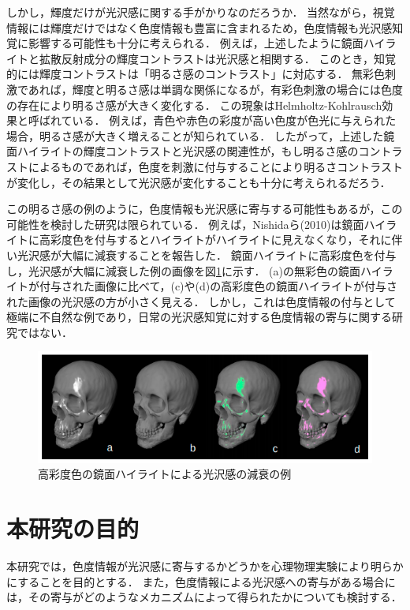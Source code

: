         しかし，輝度だけが光沢感に関する手がかりなのだろうか．
        当然ながら，視覚情報には輝度だけではなく色度情報も豊富に含まれるため，色度情報も光沢感知覚に影響する可能性も十分に考えられる．
        例えば，上述したように鏡面ハイライトと拡散反射成分の輝度コントラストは光沢感と相関する．
        このとき，知覚的には輝度コントラストは「明るさ感のコントラスト」に対応する．
        無彩色刺激であれば，輝度と明るさ感は単調な関係になるが，有彩色刺激の場合には色度の存在により明るさ感が大きく変化する．
        この現象はHelmholtz-Kohlrausch効果と呼ばれている\cite{HKeffect}．
        例えば，青色や赤色の彩度が高い色度が色光に与えられた場合，明るさ感が大きく増えることが知られている．
        したがって，上述した鏡面ハイライトの輝度コントラストと光沢感の関連性が，もし明るさ感のコントラストによるものであれば，色度を刺激に付与することにより明るさコントラストが変化し，その結果として光沢感が変化することも十分に考えられるだろう．

        この明るさ感の例のように，色度情報も光沢感に寄与する可能性もあるが，この可能性を検討した研究は限られている．
        例えば，Nishidaら(2010)は鏡面ハイライトに高彩度色を付与するとハイライトがハイライトに見えなくなり，それに伴い光沢感が大幅に減衰することを報告した\cite{Nishida}．
        鏡面ハイライトに高彩度色を付与し，光沢感が大幅に減衰した例の画像を図\ref{SaturatedLowGloss}に示す．
        (a)の無彩色の鏡面ハイライトが付与された画像に比べて，(c)や(d)の高彩度色の鏡面ハイライトが付与された画像の光沢感の方が小さく見える．
        しかし，これは色度情報の付与として極端に不自然な例であり，日常の光沢感知覚に対する色度情報の寄与に関する研究ではない．

        \begin{figure}[h]
            \centering
            \includegraphics[width=15.0cm]{./img/SaturatedLowGloss.png}
            \caption{高彩度色の鏡面ハイライトによる光沢感の減衰の例}
            \label{SaturatedLowGloss}
        \end{figure}


    \section{本研究の目的}
        本研究では，色度情報が光沢感に寄与するかどうかを心理物理実験により明らかにすることを目的とする．
        また，色度情報による光沢感への寄与がある場合には，その寄与がどのようなメカニズムによって得られたかについても検討する．

